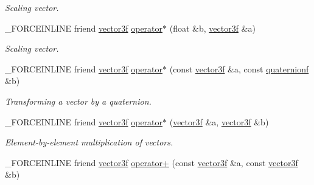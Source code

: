 \begin{DoxyCompactItemize}
\begin{DoxyCompactList}\small\item\em Scaling vector. \end{DoxyCompactList}\item 
\hypertarget{classbt_1_1vector3f_a50563643467aa6b3d3e05ff22c953cd9}{\-\_\-\-F\-O\-R\-C\-E\-I\-N\-L\-I\-N\-E friend \hyperlink{classbt_1_1vector3f}{vector3f} \hyperlink{classbt_1_1vector3f_a50563643467aa6b3d3e05ff22c953cd9}{operator$\ast$} (float \&b, \hyperlink{classbt_1_1vector3f}{vector3f} \&a)}\label{classbt_1_1vector3f_a50563643467aa6b3d3e05ff22c953cd9}

\begin{DoxyCompactList}\small\item\em Scaling vector. \end{DoxyCompactList}\item 
\hypertarget{classbt_1_1vector3f_a733d5f1efbc56a02fa0a5bc5ea707877}{\-\_\-\-F\-O\-R\-C\-E\-I\-N\-L\-I\-N\-E friend \hyperlink{classbt_1_1vector3f}{vector3f} \hyperlink{classbt_1_1vector3f_a733d5f1efbc56a02fa0a5bc5ea707877}{operator$\ast$} (const \hyperlink{classbt_1_1vector3f}{vector3f} \&a, const \hyperlink{classbt_1_1quaternionf}{quaternionf} \&b)}\label{classbt_1_1vector3f_a733d5f1efbc56a02fa0a5bc5ea707877}

\begin{DoxyCompactList}\small\item\em Transforming a vector by a quaternion. \end{DoxyCompactList}\item 
\hypertarget{classbt_1_1vector3f_aaab7d1ac14dc1669bb432aa5f4d50adc}{\-\_\-\-F\-O\-R\-C\-E\-I\-N\-L\-I\-N\-E friend \hyperlink{classbt_1_1vector3f}{vector3f} \hyperlink{classbt_1_1vector3f_aaab7d1ac14dc1669bb432aa5f4d50adc}{operator$\ast$} (\hyperlink{classbt_1_1vector3f}{vector3f} \&a, \hyperlink{classbt_1_1vector3f}{vector3f} \&b)}\label{classbt_1_1vector3f_aaab7d1ac14dc1669bb432aa5f4d50adc}

\begin{DoxyCompactList}\small\item\em Element-\/by-\/element multiplication of vectors. \end{DoxyCompactList}\item 
\hypertarget{classbt_1_1vector3f_a0ebcce6382f07ba7520647a6ac6344aa}{\-\_\-\-F\-O\-R\-C\-E\-I\-N\-L\-I\-N\-E friend \hyperlink{classbt_1_1vector3f}{vector3f} \hyperlink{classbt_1_1vector3f_a0ebcce6382f07ba7520647a6ac6344aa}{operator+} (const \hyperlink{classbt_1_1vector3f}{vector3f} \&a, const \hyperlink{classbt_1_1vector3f}{vector3f} \&b)}\label{classbt_1_1vector3f_a0ebcce6382f07ba7520647a6ac6344aa}


\end{DoxyCompactItemize}
